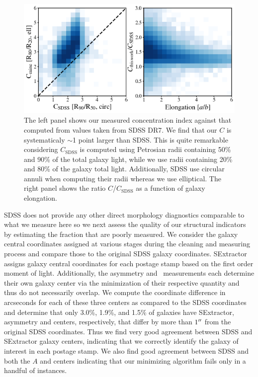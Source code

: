 \begin{figure}
\includegraphics[width=\textwidth]{Figures/compare_concentrations.png}
\caption[Comparison of concentration index from this work to that computed from SDSS.]{The left panel shows our measured concentration index against that computed from values taken from SDSS DR7. We find that our $C$ is systematicaly $\sim$1 point larger than SDSS. This is quite remarkable considering $C_{\mathrm{SDSS}}$ is computed using Petrosian radii containing 50\% and 90\% of the total galaxy light, while we use radii containing 20\% and 80\% of the galaxy total light. Additionally, SDSS use circular annuli when computing their radii whereas we use elliptical. The right panel shows the ratio $C$/$C_{\mathrm{SDSS}}$ as a function of galaxy elongation. }
\label{fig: concentrations}
\end{figure}


SDSS does not provide any other direct morphology diagnostics comparable to what we measure here so we next assess the quality of our structural indicators by estimating the fraction that are poorly measured. We consider the galaxy central coordinates assigned at various stages during the cleaning and measuring process and compare those to the original SDSS galaxy coordinates. SExtractor assigns galaxy central coordinates for each postage stamp based on the first order moment of light. Additionally, the asymmetry and ~measurements each determine their own galaxy center via the minimization of their respective quantity and thus do not necessarily overlap. We compute the coordinate difference in arcseconds for each of these three centers as compared to the SDSS coordinates and determine that only 3.0\%, 1.9\%, and 1.5\% of galaxies have SExtractor, asymmetry and  centers, respectively, that differ by more than $1\mbox{$^{\prime\prime}$}$ from the original SDSS coordinates. Thus we find very good agreement between SDSS and SExtractor galaxy centers, indicating that we correctly identify the galaxy of interest in each postage stamp. We also find good agreement between SDSS and both the $A$ and  centers indicating that our minimizing algorithm fails only in a handful of instances.  

